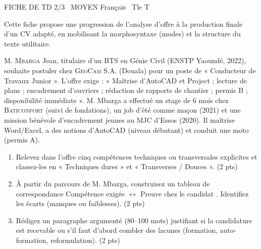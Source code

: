 \documentclass[11pt]{article}
\begin{document}
\begin{tcolorbox}[enhanced,colback=popink,colframe=popink,arc=10pt,boxrule=0pt,left=12pt,right=12pt,top=9pt,bottom=9pt]
{\color{white}\popxbold\small FICHE DE TD 2/3 \textbullet\ MOYEN \hfill Français \textbullet\ Tle T\par}
\end{tcolorbox}
\vspace{4pt}
Cette fiche propose une progression de l'analyse d'offre à la production finale d'un CV adapté, en mobilisant la morphosyntaxe (modes) et la structure du texte utilitaire.

\begin{exercice}
M. \textsc{Mbarga} Jean, titulaire d'un BTS en Génie Civil (ENSTP Yaoundé, 2022), souhaite postuler chez \textsc{GeoCam} S.A. (Douala) pour un poste de « Conducteur de Travaux Junior ». L'offre exige : « Maîtrise d'AutoCAD et Project ; lecture de plans ; encadrement d'ouvriers ; rédaction de rapports de chantier ; permis B ; disponibilité immédiate ».
M. Mbarga a effectué un stage de 6 mois chez \textsc{Baticonfort} (suivi de fondations), un job d'été comme maçon (2021) et une mission bénévole d'encadrement jeunes au MJC d'Essos (2020). Il maîtrise Word/Excel, a des notions d'AutoCAD (niveau débutant) et conduit une moto (permis A).

\begin{enumerate}
    \item Relevez dans l'offre cinq compétences techniques ou transversales explicites et classez-les en « Techniques dures » et « Transverses / Douces ». \hfill (2 pts)
    \item À partir du parcours de M. Mbarga, construisez un tableau de correspondance \og Compétence exigée $\leftrightarrow$ Preuve chez le candidat \fg. Identifiez les écarts (manques ou faiblesses). \hfill (2 pts)
    \item Rédigez un paragraphe argumenté (80--100 mots) justifiant si la candidature est \og recevable \fg ou s'il faut d'abord combler des lacunes (formation, auto-formation, reformulation). \hfill (2 pts)
\end{enumerate}
\end{exercice}
\end{document}

